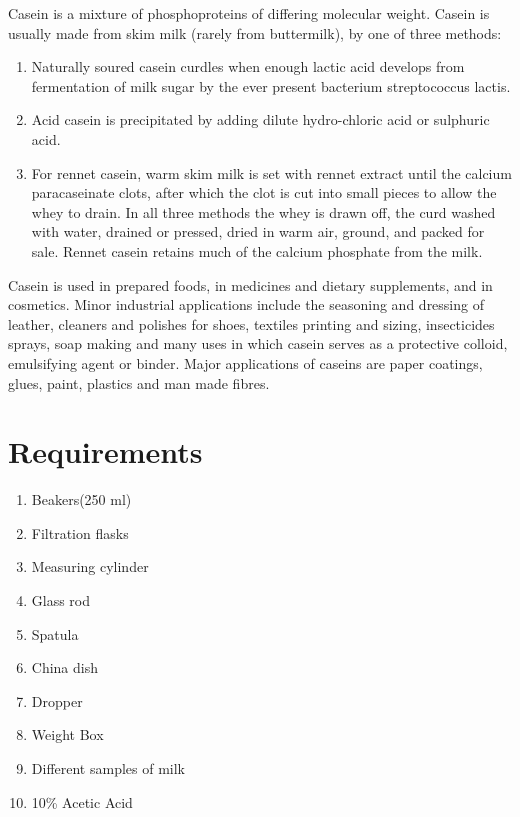 \documentclass[aps, jcp, prb, two column, showpacs,groupedaddress,]{revtex4-2}
\begin{document}
Casein is a mixture of phosphoproteins of differing molecular weight. Casein is usually made from skim milk (rarely from buttermilk), by one of three methods:

\begin{enumerate}
    \item Naturally soured casein curdles when enough lactic acid develops from fermentation of milk sugar by the ever present bacterium streptococcus lactis. \vspace{-0.1cm}
    \item Acid casein is precipitated by adding dilute hydro-chloric acid or sulphuric acid. \vspace{-0.1cm}
    \item For rennet casein, warm skim milk is set with rennet extract until the calcium paracaseinate clots, after which the clot is cut into small pieces to allow the whey to drain. In all three methods the whey is drawn off, the curd washed with water, drained or pressed, dried in warm air, ground, and packed for sale. Rennet casein retains much of the calcium phosphate from the milk. \vspace{-0.1cm}
\end{enumerate}


Casein is used in prepared foods, in medicines and dietary supplements, and in cosmetics. Minor industrial applications include the seasoning and dressing of leather, cleaners and polishes for shoes, textiles printing and sizing, insecticides sprays, soap making and many uses in which casein serves as a protective colloid, emulsifying agent or binder. Major applications of caseins are paper coatings, glues, paint, plastics and man made fibres.


\section{Requirements}

\begin{enumerate}
    \item Beakers(250 ml) \vspace{-0.1cm}
    \item Filtration flasks \vspace{-0.1cm}
    \item Measuring cylinder \vspace{-0.1cm}
    \item Glass rod \vspace{-0.1cm}
    \item Spatula \vspace{-0.1cm}
    \item China dish \vspace{-0.1cm}
    \item Dropper \vspace{-0.1cm}
    \item Weight Box \vspace{-0.1cm}
    \item Different samples of milk \vspace{-0.1cm}
    \item 10\% Acetic Acid \vspace{-0.1cm}
\end{enumerate}
\end{document}
